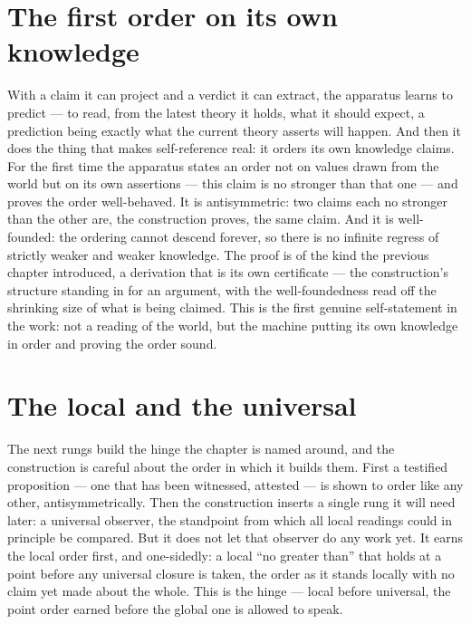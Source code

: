 \section{The first order on its own knowledge}
\label{se:order-on-knowledge}

With a claim it can project and a verdict it can extract, the apparatus learns to predict --- to read,
from the latest theory it holds, what it should expect, a prediction being exactly what the current theory
asserts will happen. And then it does the thing that makes self-reference real: it orders its own knowledge
claims. For the first time the apparatus states an order not on values drawn from the world but on its own
assertions --- this claim is no stronger than that one --- and proves the order well-behaved. It is
antisymmetric: two claims each no stronger than the other are, the construction proves, the same claim. And
it is well-founded: the ordering cannot descend forever, so there is no infinite regress of strictly weaker
and weaker knowledge. The proof is of the kind the previous chapter introduced, a derivation that is its
own certificate --- the construction's structure standing in for an argument, with the well-foundedness
read off the shrinking size of what is being claimed. This is the first genuine self-statement in the work:
not a reading of the world, but the machine putting its own knowledge in order and proving the order sound.

\section{The local and the universal}
\label{se:local-and-universal}

The next rungs build the hinge the chapter is named around, and the construction is careful about the
order in which it builds them. First a testified proposition --- one that has been witnessed, attested ---
is shown to order like any other, antisymmetrically. Then the construction inserts a single rung it will
need later: a universal observer, the standpoint from which all local readings could in principle be
compared. But it does not let that observer do any work yet. It earns the local order first, and
one-sidedly: a local ``no greater than'' that holds at a point before any universal closure is taken, the
order as it stands locally with no claim yet made about the whole. This is the hinge --- local before
universal, the point order earned before the global one is allowed to speak.


